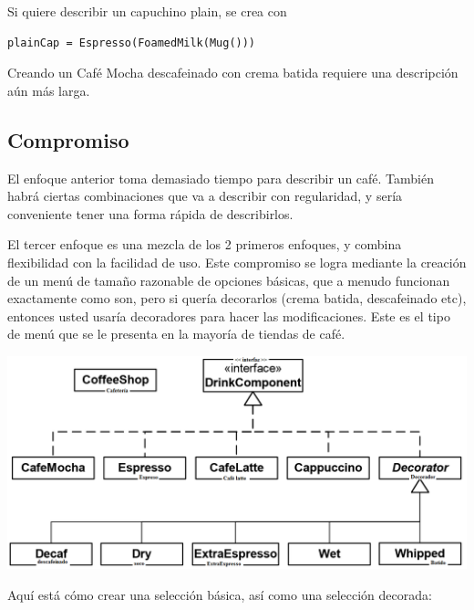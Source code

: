 \documentclass{article}
\begin{document}
Si quiere describir un capuchino plain, se crea con \newline

\begin{lstlisting} 
plainCap = Espresso(FoamedMilk(Mug()))
\end{lstlisting}

Creando un Café Mocha descafeinado con crema batida requiere una descripción aún más larga. \newline

\subsection{Compromiso}

El enfoque anterior  toma demasiado tiempo para describir un café. También habrá ciertas combinaciones que va a describir con regularidad, y sería conveniente tener una forma rápida de describirlos.     \newline

El tercer enfoque es una mezcla de los 2 primeros enfoques, y combina flexibilidad con la facilidad de uso. Este compromiso se logra mediante la creación de un menú de tamaño razonable de opciones básicas, que a menudo funcionan exactamente como son, pero si quería decorarlos (crema batida, descafeinado etc), entonces usted usaría decoradores para hacer las modificaciones. Este es el tipo de menú que se le presenta en la mayoría de tiendas de café.    \newline

\includegraphics[width=\textwidth]{PaginaNo80}

Aquí está cómo crear una selección básica, así como una selección decorada:     \newline
\end{document}
